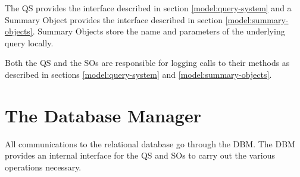 The QS provides the interface described in section \ref{model:query-system} and a Summary Object provides the interface described in section \ref{model:summary-objects}. Summary Objects store the name and parameters of the underlying query locally.

Both the QS and the SOs are responsible for logging calls to their methods as described in sections \ref{model:query-system} and \ref{model:summary-objects}.

\section{The Database Manager}

All communications to the relational database go through the DBM. The DBM provides an internal interface for the QS and SOs to carry out the various operations necessary.

